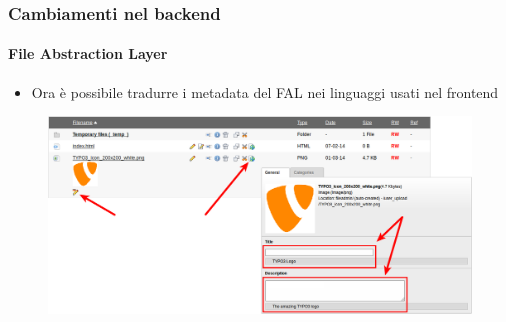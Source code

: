 
\begin{frame}[fragile]
	\frametitle{Cambiamenti nel backend}
	\framesubtitle{File Abstraction Layer}

	\begin{itemize}
		\item Ora è possibile tradurre i metadata del FAL nei linguaggi usati nel frontend
	\end{itemize}

	\begin{figure}
		\includegraphics[width=0.95\linewidth]{Images/BackendChanges/FalTranslateMetaData.png}
	\end{figure}

\end{frame}


